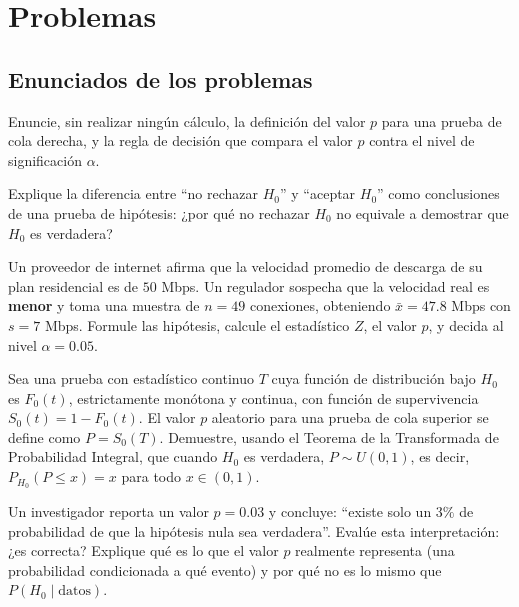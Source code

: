 \section*{Problemas}

\subsection*{Enunciados de los problemas}

\begin{problema}
	\label{prob:f1273a2}
	Enuncie, sin realizar ningún cálculo, la definición del valor $p$ para una prueba de cola derecha, y la regla de decisión que compara el valor $p$ contra el nivel de significación $\alpha$.
\end{problema}

\begin{problema}
	\label{prob:ed08255}
	Explique la diferencia entre ``no rechazar $H_0$'' y ``aceptar $H_0$'' como conclusiones de una prueba de hipótesis: ¿por qué no rechazar $H_0$ no equivale a demostrar que $H_0$ es verdadera?
\end{problema}

\begin{problema}
	\label{prob:28d9ae6}
	Un proveedor de internet afirma que la velocidad promedio de descarga de su plan residencial es de $50$ Mbps. Un regulador sospecha que la velocidad real es \textbf{menor} y toma una muestra de $n=49$ conexiones, obteniendo $\bar x=47.8$ Mbps con $s=7$ Mbps. Formule las hipótesis, calcule el estadístico $Z$, el valor $p$, y decida al nivel $\alpha=0.05$.
\end{problema}

\begin{problema}
	\label{prob:ff47cad}
	Sea una prueba con estadístico continuo $T$ cuya función de distribución bajo $H_0$ es $F_0(t)$, estrictamente monótona y continua, con función de supervivencia $S_0(t)=1-F_0(t)$. El valor $p$ aleatorio para una prueba de cola superior se define como $P=S_0(T)$. Demuestre, usando el Teorema de la Transformada de Probabilidad Integral, que cuando $H_0$ es verdadera, $P\sim U(0,1)$, es decir, $P_{H_0}(P\le x)=x$ para todo $x\in(0,1)$.
\end{problema}

\begin{problema}
	\label{prob:af3b6da}
	Un investigador reporta un valor $p=0.03$ y concluye: ``existe solo un $3\%$ de probabilidad de que la hipótesis nula sea verdadera''. Evalúe esta interpretación: ¿es correcta? Explique qué es lo que el valor $p$ realmente representa (una probabilidad condicionada a qué evento) y por qué no es lo mismo que $P(H_0\mid\text{datos})$.
\end{problema}

